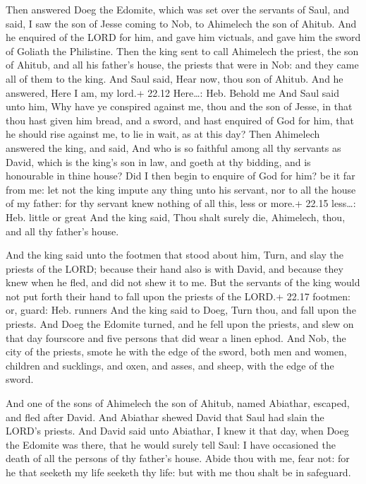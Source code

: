  Then answered Doeg the Edomite, which was set over the
servants of Saul, and said, I saw the son of Jesse coming to Nob, to
Ahimelech the son of Ahitub.  And he enquired of the LORD
for him, and gave him victuals, and gave him the sword of Goliath the
Philistine.  Then the king sent to call Ahimelech the
priest, the son of Ahitub, and all his father's house, the priests that
were in Nob: and they came all of them to the king.  And
Saul said, Hear now, thou son of Ahitub. And he answered, Here I am, my
lord.+ 22.12 Here\ldots: Heb. Behold me  And Saul said unto
him, Why have ye conspired against me, thou and the son of Jesse, in
that thou hast given him bread, and a sword, and hast enquired of God
for him, that he should rise against me, to lie in wait, as at this day?
 Then Ahimelech answered the king, and said, And who is so
faithful among all thy servants as David, which is the king's son in
law, and goeth at thy bidding, and is honourable in thine house?
 Did I then begin to enquire of God for him? be it far from
me: let not the king impute any thing unto his servant, nor to all the
house of my father: for thy servant knew nothing of all this, less or
more.+ 22.15 less\ldots: Heb. little or great  And the king
said, Thou shalt surely die, Ahimelech, thou, and all thy father's
house.

 And the king said unto the footmen that stood about him,
Turn, and slay the priests of the LORD; because their hand also is with
David, and because they knew when he fled, and did not shew it to me.
But the servants of the king would not put forth their hand to fall upon
the priests of the LORD.+ 22.17 footmen: or, guard: Heb. runners
 And the king said to Doeg, Turn thou, and fall upon the
priests. And Doeg the Edomite turned, and he fell upon the priests, and
slew on that day fourscore and five persons that did wear a linen ephod.
 And Nob, the city of the priests, smote he with the edge
of the sword, both men and women, children and sucklings, and oxen, and
asses, and sheep, with the edge of the sword.

 And one of the sons of Ahimelech the son of Ahitub,
named Abiathar, escaped, and fled after David.  And
Abiathar shewed David that Saul had slain the LORD's priests.
 And David said unto Abiathar, I knew it that day, when
Doeg the Edomite was there, that he would surely tell Saul: I have
occasioned the death of all the persons of thy father's house.
 Abide thou with me, fear not: for he that seeketh my life
seeketh thy life: but with me thou shalt be in safeguard.

